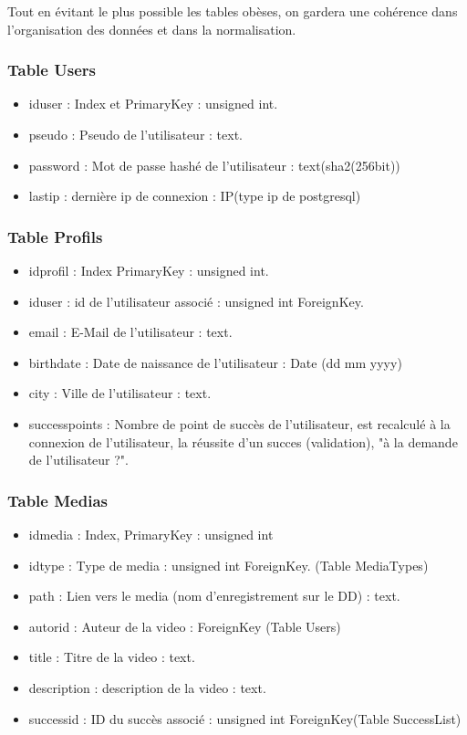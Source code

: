 \documentclass[a4paper,10pt]{article}
\begin{document}
Tout en évitant le plus possible les tables obèses, on gardera une cohérence dans l'organisation des données et dans la normalisation.

\subsubsection{Table Users}

\begin{itemize}
\item iduser : Index et PrimaryKey : unsigned int.
\item pseudo : Pseudo de l'utilisateur : text.
\item password : Mot de passe hashé de l'utilisateur : text(sha2(256bit))
\item lastip : dernière ip de connexion : IP(type ip de postgresql)
\end{itemize}

\subsubsection{Table Profils}

\begin{itemize}
\item idprofil : Index PrimaryKey : unsigned int.
\item iduser : id de l'utilisateur associé : unsigned int ForeignKey.
\item email : E-Mail de l'utilisateur : text.
\item birthdate : Date de naissance de l'utilisateur : Date (dd mm yyyy)
\item city : Ville de l'utilisateur : text.
\item successpoints : Nombre de point de succès de l'utilisateur, est recalculé à la connexion de l'utilisateur, la réussite d'un succes (validation), "à la demande de l'utilisateur ?".
\end{itemize}

\subsubsection{Table Medias}

\begin{itemize}
\item idmedia : Index, PrimaryKey : unsigned int
\item idtype : Type de media : unsigned int ForeignKey. (Table MediaTypes)
\item path : Lien vers le media (nom d'enregistrement sur le DD) : text.
\item autorid : Auteur de la video : ForeignKey (Table Users)
\item title : Titre de la video : text.
\item description : description de la video : text.
\item successid : ID du succès associé : unsigned int ForeignKey(Table SuccessList)
\end{itemize}
\end{document}

